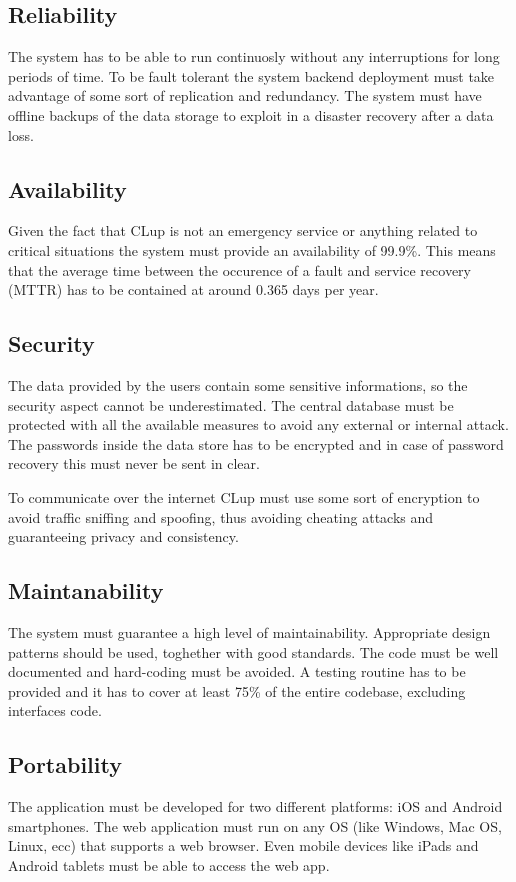 \subsection{Reliability}
The system has to be able to run continuosly without any interruptions for long periods of time. To be fault tolerant the system backend deployment must take advantage of some sort of replication and redundancy. The system must have offline backups of the data storage to exploit in a disaster recovery after a data loss.

\subsection{Availability}
Given the fact that CLup is not an emergency service or anything related to critical situations the system must provide an availability of 99.9\%. This means that the average time between the occurence of a fault and service recovery (MTTR) has to be contained at around 0.365 days per year. 

\subsection{Security}
The data provided by the users contain some sensitive informations, so the security aspect cannot be underestimated. The central database must be protected with all the available measures to avoid any external or internal attack. The passwords inside the data store has to be encrypted and in case of password recovery this must never be sent in clear.

To communicate over the internet CLup must use some sort of encryption to avoid traffic sniffing and spoofing, thus avoiding cheating attacks and guaranteeing privacy and consistency.

\subsection{Maintanability}
The system must guarantee a high level of maintainability. Appropriate design patterns should be used, toghether with good standards. The code must be well documented and hard-coding must be avoided. A testing routine has to be provided and it has to cover at least 75\% of the entire codebase, excluding interfaces code.

\subsection{Portability}
The application must be developed for two different platforms: iOS and Android smartphones. The web application must run on any OS (like Windows, Mac OS, Linux, ecc) that supports a web browser. Even mobile devices like iPads and Android tablets must be able to access the web app.